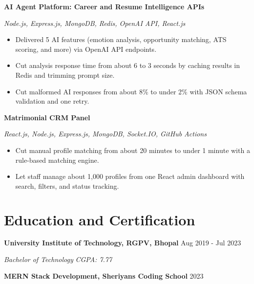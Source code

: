 \documentclass[a4paper,10pt]{article}
\newcommand{\company}[2]{\textbf{#1} \hfill #2\par}
\newcommand{\position}[2]{\textit{#1} \hfill \textit{#2}\par\vspace{1pt}}
\newcommand{\project}[2]{\vspace{2pt}\textbf{#1}\par\textit{#2}\par\vspace{1pt}}
\begin{document}
\project{AI Agent Platform: Career and Resume Intelligence APIs}{Node.js, Express.js, MongoDB, Redis, OpenAI API, React.js}
\begin{itemize}
  \item Delivered 5 AI features (emotion analysis, opportunity matching, ATS scoring, and more) via OpenAI API endpoints.
  \item Cut analysis response time from about 6 to 3 seconds by caching results in Redis and trimming prompt size.
  \item Cut malformed AI responses from about 8\% to under 2\% with JSON schema validation and one retry.
\end{itemize}

\project{Matrimonial CRM Panel}{React.js, Node.js, Express.js, MongoDB, Socket.IO, GitHub Actions}
\begin{itemize}
  \item Cut manual profile matching from about 20 minutes to under 1 minute with a rule-based matching engine.
  \item Let staff manage about 1,000 profiles from one React admin dashboard with search, filters, and status tracking.
\end{itemize}

\section{Education and Certification}
\company{University Institute of Technology, RGPV, Bhopal}{Aug 2019 - Jul 2023}
\position{Bachelor of Technology}{CGPA: 7.77}
\vspace{2pt}
\company{MERN Stack Development, Sheriyans Coding School}{2023}
\end{document}
